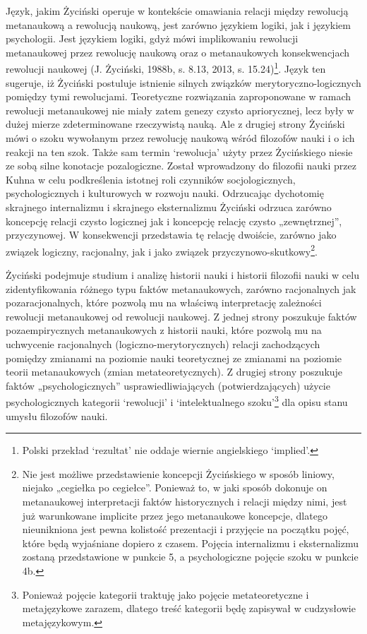\documentclass{article}
\begin{document}
Język, jakim Życiński operuje w kontekście omawiania relacji między rewolucją metanaukową a rewolucją naukową, jest
zarówno językiem logiki, jak i językiem psychologii. Jest językiem logiki, gdyż mówi implikowaniu rewolucji
metanaukowej przez rewolucję naukową oraz o metanaukowych konsekwencjach rewolucji naukowej
\label{ref:RND7WtbaMWBYd}(J. Życiński, 1988b, s. 8.13, 2013, s. 15.24)\footnote{Polski przekład ‘rezultat’ nie oddaje
wiernie angielskiego ‘implied’.}. Język ten sugeruje, iż Życiński postuluje istnienie silnych związków
merytoryczno-logicznych pomiędzy tymi rewolucjami. Teoretyczne rozwiązania zaproponowane w ramach rewolucji
metanaukowej nie miały zatem genezy czysto apriorycznej, lecz były w dużej mierze  zdeterminowane rzeczywistą nauką.
Ale z drugiej strony Życiński mówi o szoku wywołanym przez rewolucję naukową wśród filozofów nauki i o ich reakcji na
ten szok. Także sam termin ‘rewolucja’ użyty przez Życińskiego niesie ze sobą silne konotacje pozalogiczne. Został
wprowadzony do filozofii nauki przez Kuhna w celu podkreślenia istotnej roli czynników socjologicznych,
psychologicznych i kulturowych w rozwoju nauki. Odrzucając dychotomię skrajnego internalizmu i skrajnego eksternalizmu
Życiński odrzuca zarówno koncepcję relacji czysto logicznej jak i koncepcję relację czysto „zewnętrznej”, przyczynowej.
W konsekwencji przedstawia tę relację dwoiście, zarówno jako związek logiczny, racjonalny, jak i jako związek
przyczynowo-skutkowy\footnote{Nie jest możliwe przedstawienie koncepcji Życińskiego w sposób liniowy, niejako „cegiełka
po cegiełce”. Ponieważ to, w jaki sposób dokonuje on metanaukowej interpretacji faktów historycznych i relacji między
nimi, jest już warunkowane implicite przez jego metanaukowe koncepcje, dlatego nieunikniona jest pewna kolistość
prezentacji i przyjęcie na początku pojęć, które będą wyjaśniane dopiero z czasem. Pojęcia internalizmu i eksternalizmu
zostaną przedstawione w punkcie 5, a psychologiczne pojęcie szoku w punkcie 4b.}.

Życiński podejmuje studium i analizę historii nauki i historii filozofii nauki w celu zidentyfikowania różnego typu
faktów metanaukowych, zarówno racjonalnych jak pozaracjonalnych, które pozwolą mu na właściwą interpretację zależności
rewolucji metanaukowej od rewolucji naukowej. Z jednej strony poszukuje faktów pozaempirycznych metanaukowych z
historii nauki, które pozwolą mu na uchwycenie racjonalnych (logiczno-merytorycznych) relacji zachodzących pomiędzy
zmianami na poziomie nauki teoretycznej ze zmianami na poziomie teorii metanaukowych (zmian metateoretycznych). Z
drugiej strony poszukuje faktów „psychologicznych” usprawiedliwiających (potwierdzających) użycie psychologicznych
kategorii ‘rewolucji’ i ‘intelektualnego szoku’\footnote{Ponieważ pojęcie kategorii traktuję jako pojęcie
metateoretyczne i metajęzykowe zarazem, dlatego treść kategorii będę zapisywał w cudzysłowie metajęzykowym.} dla opisu
stanu umysłu filozofów nauki.
\end{document}
